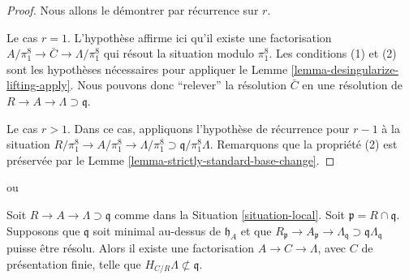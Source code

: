 \begin{proof}
Nous allons le démontrer par récurrence sur $r$.

\medskip\noindent
Le cas $r = 1$. L'hypothèse affirme ici qu'il existe une
factorisation $A/\pi_1^8 \to \bar C \to \Lambda/\pi_1^8$
qui résout la situation modulo $\pi_1^8$. Les conditions (1) et
(2) sont les hypothèses nécessaires pour appliquer le
Lemme \ref{lemma-desingularize-lifting-apply}.
Nous pouvons donc ``relever'' la résolution $\bar C$
en une résolution de $R \to A \to \Lambda \supset \mathfrak q$.

\medskip\noindent
Le cas $r > 1$. Dans ce cas, appliquons l'hypothèse de récurrence pour $r - 1$
à la situation
$R/\pi_1^8 \to A/\pi_1^8 \to \Lambda/\pi_1^8
\supset \mathfrak q/\pi_1^8\Lambda$.
Remarquons que la propriété (2) est préservée par le
Lemme \ref{lemma-strictly-standard-base-change}.
\end{proof}

\begin{lemma}
\label{lemma-delocalize-weak}
\begin{reference}
\cite[Lemma 12.2]{swan} ou
\cite[Lemma 2]{popescu-GND}
\end{reference}
Soit $R \to A \to \Lambda \supset \mathfrak q$ comme dans la
Situation \ref{situation-local}. Soit $\mathfrak p = R \cap \mathfrak q$.
Supposons que $\mathfrak q$ soit minimal au-dessus de $\mathfrak h_A$ et que
$R_\mathfrak p \to A_\mathfrak p \to \Lambda_\mathfrak q
\supset \mathfrak q\Lambda_\mathfrak q$ puisse être résolu.
Alors il existe une factorisation $A \to C \to \Lambda$, avec $C$ de
présentation finie, telle que $H_{C/R} \Lambda \not \subset \mathfrak q$.
\end{lemma}

